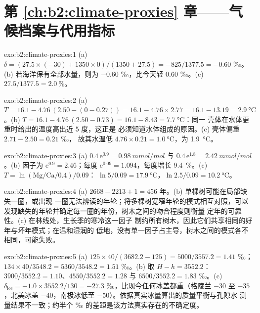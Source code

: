 \section*{第 \ref{ch:b2:climate-proxies} 章——气候档案与代用指标}

\begin{solution}{exo:b2:climate-proxies:1}
(a) $\delta = (27.5 \times (-30) + 1350 \times 0)/(1350 + 27.5) = -825/1377.5 = -0.60$ ‰。
(b) 若海洋保有全部水量，则为 $-0.60$ ‰，比今天轻
\num{0.60} ‰。(c) $27.5/1377.5 = \qty{2.0}{\percent}$。
\end{solution}

\begin{solution}{exo:b2:climate-proxies:2}
(a) $T = 16.1 - 4.76\,(2.50 - (0 - 0.27)) = 16.1 - 4.76 \times 2.77 = 16.1 - 13.19 =
\qty{2.9}{\celsius}$。(b) $T = 16.1 - 4.76\,(2.50 - 0.73) = 16.1 - 8.43 = \qty{7.7}{\celsius}$：同一
壳体在水体更重时给出的温度高出近 5 度，这正是
必须知道水体组成的原因。(c) 壳体偏重 $2.71 - 2.50 = 0.21$ ‰，
故其水温低 $4.76 \times 0.21 = \qty{1.0}{\celsius}$，为 \qty{1.9}{\celsius}。
\end{solution}

\begin{solution}{exo:b2:climate-proxies:3}
(a) $0.4\,\mathrm{e}^{0.9} = \qty{0.98}{mmol/mol}$ 与 $0.4\,\mathrm{e}^{1.8} =
\qty{2.42}{mmol/mol}$。(b) 因子为 $\mathrm{e}^{0.9} = 2.46$；每度 $\mathrm{e}^{0.09}
= 1.094$，每度增长 \qty{9.4}{\percent}。(c) $T = \ln(\text{Mg/Ca}/0.4)/0.09$：
$\ln 5/0.09 = \qty{17.9}{\celsius}$，$\ln 2.5/0.09 = \qty{10.2}{\celsius}$。
\end{solution}

\begin{solution}{exo:b2:climate-proxies:4}
(a) $2668 - 2213 + 1 = 456$ 年。(b) 单棵树可能在局部缺失一圈，或出现
一圈无法辨读的年轮；将多棵树宽窄年轮的模式相互对照，可以
发现缺失的年轮并确定每一圈的年份，树木之间的吻合程度则衡量
定年的可靠性。(c) 在林线处，生长季的寒冷这一因子
制约所有树木，因此它们共享相同的好年与坏年模式；在温和湿润的
低地，没有单一因子占主导，树木之间的模式各不相同，可能失败。
\end{solution}

\begin{solution}{exo:b2:climate-proxies:5}
(a) $125 \times 40/(3682.2 - 125) = 5000/3557.2 = 1.41$ ‰；$134 \times 40/3548.2 =
5360/3548.2 = 1.51$ ‰。(b) 取 $H - h = 3552.2$：$3900/3552.2 = 1.10$、$4550/3552.2 = 1.28$
与 $6500/3552.2 = 1.83$ ‰。(c) $\delta_{\mathrm{ice}} = -1.0 \times 3552.2/130 = -27.3$
‰，比现今任何冰盖都重（格陵兰 $-30$ 至 $-35$，北美冰盖
$-40$，南极冰低至 $-50$）。依据真实冰量算出的质量平衡与孔隙水
测量结果不一致；约半个 ‰ 的差距是该方法真实存在的不确定度。
\end{solution}

